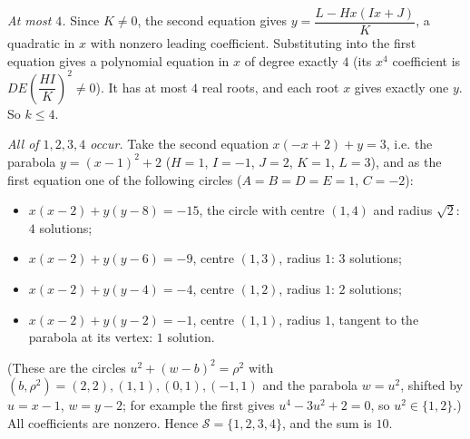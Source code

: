 \emph{At most $4$.} Since $K\ne0$, the second equation gives $y=\dfrac{L-Hx(Ix+J)}{K}$, a quadratic in $x$ with nonzero leading coefficient. Substituting into the first equation gives a polynomial equation in $x$ of degree exactly $4$ (its $x^4$ coefficient is $DE\left(\dfrac{HI}{K}\right)^2\ne0$). It has at most $4$ real roots, and each root $x$ gives exactly one $y$. So $k\le4$.

\emph{All of $1,2,3,4$ occur.} Take the second equation $x(-x+2)+y=3$, i.e. the parabola $y=(x-1)^2+2$ ($H=1$, $I=-1$, $J=2$, $K=1$, $L=3$), and as the first equation one of the following circles ($A=B=D=E=1$, $C=-2$):
\begin{itemize}
\item $x(x-2)+y(y-8)=-15$, the circle with centre $(1,4)$ and radius $\sqrt2$: $4$ solutions;
\item $x(x-2)+y(y-6)=-9$, centre $(1,3)$, radius $1$: $3$ solutions;
\item $x(x-2)+y(y-4)=-4$, centre $(1,2)$, radius $1$: $2$ solutions;
\item $x(x-2)+y(y-2)=-1$, centre $(1,1)$, radius $1$, tangent to the parabola at its vertex: $1$ solution.
\end{itemize}
(These are the circles $u^2+(w-b)^2=\rho^2$ with $(b,\rho^2)=(2,2),(1,1),(0,1),(-1,1)$ and the parabola $w=u^2$, shifted by $u=x-1$, $w=y-2$; for example the first gives $u^4-3u^2+2=0$, so $u^2\in\{1,2\}$.) All coefficients are nonzero. Hence $\mathcal S=\{1,2,3,4\}$, and the sum is $\boxed{10}$.
